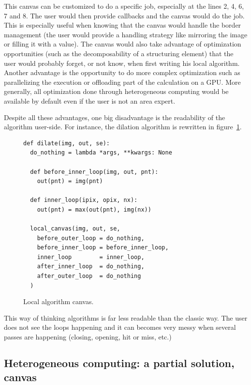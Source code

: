 This canvas can be customized to do a specific job, especially at the lines 2, 4, 6, 7 and 8. The user would then
provide callbacks and the canvas would do the job. This is especially useful when knowing that the canvas would handle
the border management (the user would provide a handling strategy like mirroring the image or filling it with a value).
The canvas would also take advantage of optimization opportunities (such as the decomposability of a structuring
element) that the user would probably forget, or not know, when first writing his local algorithm. Another advantage is
the opportunity to do more complex optimization such as parallelizing the execution or offloading part of the
calculation on a GPU. More generally, all optimization done through heterogeneous computing would be available by
default even if the user is not an area expert.

Despite all these advantages, one big disadvantage is the readability of the algorithm user-side. For instance, the
dilation algorithm is rewritten in figure~\ref{code:local.algorithm.dilate}.

\begin{figure}[tbh]
  \centering
  \begin{verbatim}
def dilate(img, out, se):
  do_nothing = lambda *args, **kwargs: None

  def before_inner_loop(img, out, pnt):
    out(pnt) = img(pnt)
  
  def inner_loop(ipix, opix, nx):
    out(pnt) = max(out(pnt), img(nx))

  local_canvas(img, out, se,
    before_outer_loop = do_nothing,
    before_inner_loop = before_inner_loop,
    inner_loop        = inner_loop,
    after_inner_loop  = do_nothing,
    after_outer_loop  = do_nothing
  )
  \end{verbatim}

  \caption{Local algorithm canvas.}
  \label{code:local.algorithm.dilate}
\end{figure}

This way of thinking algorithms is far less readable than the classic way. The user does not see the loops happening and
it can becomes very messy when several passes are happening (closing, opening, hit or miss, etc.)

\vspace{1cm}


\subsection{Heterogeneous computing: a partial solution, canvas}
\label{subsec:heterogeneous}

